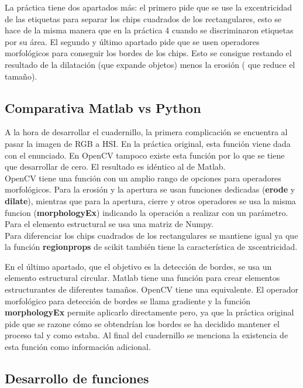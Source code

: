 \documentclass[a4paper,12pt]{report}
\begin{document}
La práctica tiene dos apartados más: el primero pide que se use la excentricidad de las etiquetas para separar los chips cuadrados de los rectangulares, esto se hace de la misma manera que en la práctica 4 cuando se discriminaron etiquetas por su área. El segundo y último apartado pide que se usen operadores morfológicos para conseguir los bordes de los chips. Esto se consigue restando el resultado de la dilatación (que expande objetos) menos la erosión ( que reduce el tamaño).\\

\subsection{Comparativa Matlab vs Python}

A la hora de desarrollar el cuadernillo, la primera complicación se encuentra al pasar la imagen de RGB a HSI. En la práctica original, esta función viene dada con el enunciado. En OpenCV tampoco existe esta función por lo que  se tiene que desarrollar de cero. El resultado es idéntico al de Matlab.\\

OpenCV tiene una función con un amplio rango de opciones para operadores morfológicos.  Para la erosión y la apertura se usan funciones dedicadas (\textbf{erode} y \textbf{dilate}), mientras que para la apertura, cierre y otros operadores se usa la misma funcion (\textbf{morphologyEx}) indicando la operación a realizar con un parámetro. Para el elemento estructural se usa una matriz de Numpy.\\

Para diferenciar los chips cuadrados de los rectangulares se mantiene igual ya que la función \textbf{regionprops} de scikit también tiene la característica de xscentricidad.

En el último apartado, que el objetivo es la detección de bordes, se usa un elemento estructural circular. Matlab  tiene una función para crear elementos  estructurantes de diferentes tamaños. OpenCV tiene una equivalente. El operador morfológico para detección de bordes se llama gradiente y la función \textbf{morphologyEx} permite aplicarlo directamente pero, ya que la práctica original pide que se razone cómo se obtendrían los bordes se ha decidido mantener el proceso tal y como estaba. Al final del cuadernillo se menciona la existencia de esta función como información adicional.

\subsection{Desarrollo de funciones}
\end{document}
